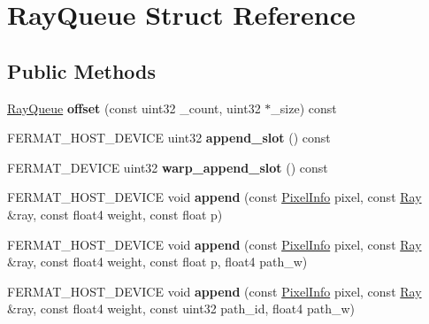 \hypertarget{struct_ray_queue}{}\section{Ray\+Queue Struct Reference}
\label{struct_ray_queue}
\subsection*{Public Methods}
\begin{DoxyCompactItemize}
\item 
\mbox{\label{struct_ray_queue_aeaf37e95f34be13ed3cdd15e9a44d552}} 
\hyperlink{struct_ray_queue}{Ray\+Queue} {\bfseries offset} (const uint32 \+\_\+count, uint32 $\ast$\+\_\+size) const
\item 
\mbox{\label{struct_ray_queue_a02b9a40bbb796acf9b295a8f12db9c3a}} 
F\+E\+R\+M\+A\+T\+\_\+\+H\+O\+S\+T\+\_\+\+D\+E\+V\+I\+CE uint32 {\bfseries append\+\_\+slot} () const
\item 
\mbox{\label{struct_ray_queue_aa2c77fb7bee173caff4b72bc226b89b6}} 
F\+E\+R\+M\+A\+T\+\_\+\+D\+E\+V\+I\+CE uint32 {\bfseries warp\+\_\+append\+\_\+slot} () const
\item 
\mbox{\label{struct_ray_queue_af9a082ee79d0ab8d3d42387f3b2e6eb9}} 
F\+E\+R\+M\+A\+T\+\_\+\+H\+O\+S\+T\+\_\+\+D\+E\+V\+I\+CE void {\bfseries append} (const \hyperlink{union_pixel_info}{Pixel\+Info} pixel, const \hyperlink{struct_ray}{Ray} \&ray, const float4 weight, const float p)
\item 
\mbox{\label{struct_ray_queue_adf98e4b3e07f815c271a76d0b19c6aa8}} 
F\+E\+R\+M\+A\+T\+\_\+\+H\+O\+S\+T\+\_\+\+D\+E\+V\+I\+CE void {\bfseries append} (const \hyperlink{union_pixel_info}{Pixel\+Info} pixel, const \hyperlink{struct_ray}{Ray} \&ray, const float4 weight, const float p, float4 path\+\_\+w)
\item 
\mbox{\label{struct_ray_queue_a98d8e61a3241938dcf428c7e3f0fcfaa}} 
F\+E\+R\+M\+A\+T\+\_\+\+H\+O\+S\+T\+\_\+\+D\+E\+V\+I\+CE void {\bfseries append} (const \hyperlink{union_pixel_info}{Pixel\+Info} pixel, const \hyperlink{struct_ray}{Ray} \&ray, const float4 weight, const uint32 path\+\_\+id, float4 path\+\_\+w)

\end{DoxyCompactItemize}
